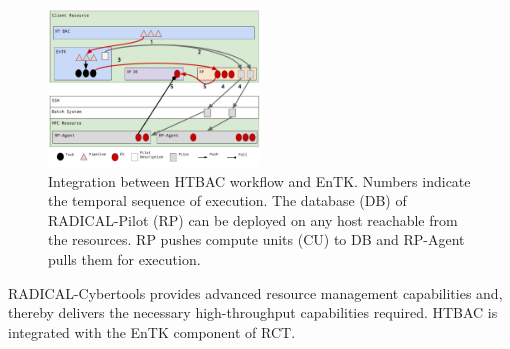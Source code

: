 \begin{figure}
\centering
  \includegraphics[width=0.5\textwidth]{FIGURES/ht-bac-rp_integration.pdf}
  \caption{Integration between HTBAC workflow and EnTK\@. Numbers indicate
  the temporal sequence of execution. The database (DB) of RADICAL-Pilot (RP)
  can be deployed on any host reachable from the resources. RP pushes compute
  units (CU) to DB and RP-Agent pulls them for execution. }\label{figure:ht-bac_rp}
\end{figure}

RADICAL-Cybertools provides advanced resource management capabilities and,
thereby delivers the necessary high-throughput capabilities required. HTBAC
is integrated with the EnTK component of RCT.


